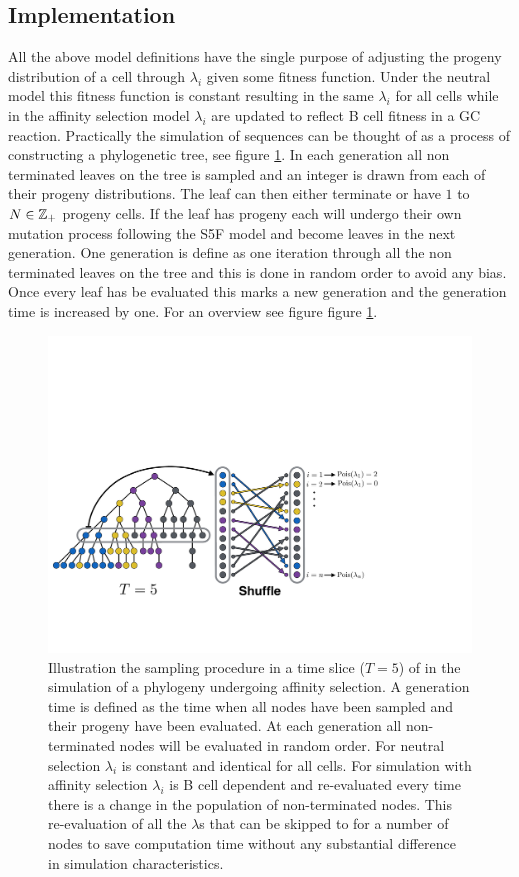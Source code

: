 \subsection{Implementation}
All the above model definitions have the single purpose of adjusting the progeny distribution of a cell through $\lambda_i$ given some fitness function.
Under the neutral model this fitness function is constant resulting in the same $\lambda_i$ for all cells while in the affinity selection model $\lambda_i$ are updated to reflect B cell fitness in a GC reaction.
Practically the simulation of sequences can be thought of as a process of constructing a phylogenetic tree, see figure \ref{fig:tree_iteration}.
In each generation all non terminated leaves on the tree is sampled and an integer is drawn from each of their progeny distributions.
The leaf can then either terminate or have $1$ to $N \in \mathbb{Z}_+$ progeny cells.
If the leaf has progeny each will undergo their own mutation process following the S5F model and become leaves in the next generation.
One generation is define as one iteration through all the non terminated leaves on the tree and this is done in random order to avoid any bias.
Once every leaf has be evaluated this marks a new generation and the generation time is increased by one.
For an overview see figure figure \ref{fig:tree_iteration}.

\begin{figure}
    \centering
    \includegraphics[width=1\textwidth]{figures/tree_iteration.pdf}
    \caption{
        \label{fig:tree_iteration}
        Illustration the sampling procedure in a time slice ($T=5$) of in the simulation of a phylogeny undergoing affinity selection.
        A generation time is defined as the time when all nodes have been sampled and their progeny have been evaluated.
        At each generation all non-terminated nodes will be evaluated in random order.
        For neutral selection $\lambda_i$ is constant and identical for all cells.
        For simulation with affinity selection $\lambda_i$ is B cell dependent and re-evaluated every time there is a change in the population of non-terminated nodes.
        This re-evaluation of all the $\lambda$s that can be skipped to for a number of nodes to save computation time without any substantial difference in simulation characteristics.
    }
\end{figure}


